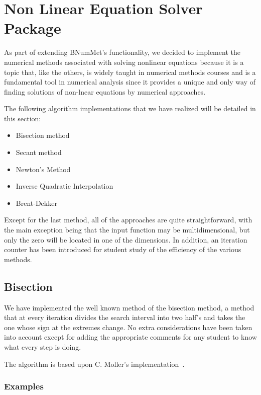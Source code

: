 \section{Non Linear Equation Solver Package}
As part of extending BNumMet's functionality, we decided to implement the numerical methods associated with solving nonlinear equations because it is a topic that, like the others, is widely taught in numerical methods courses and is a fundamental tool in numerical analysis since it provides a unique and only way of finding solutions of non-lnear equations by numerical approaches.

The following algorithm implementations that we have realized will be detailed in this section:
\begin{itemize}
    \item Bisection method 
    \item Secant  method 
    \item Newton's Method 
    \item Inverse Quadratic Interpolation 
    \item Brent-Dekker  
\end{itemize}

Except for the last method, all of the approaches are quite straightforward, with the main exception being that the input function may be multidimensional, but only the zero will be located in one of the dimensions. In addition, an iteration counter has been introduced for student study of the efficiency of the various methods.

\subsection{Bisection}
We have implemented the well known method of the bisection method, a method that at every iteration divides the search interval into two half's and takes the one whose sign at the extremes change. No extra considerations have been taken into account except for adding the appropriate comments for any student to know what every step is doing.

The algorithm is based upon C. Moller's implementation~\cite{doi:10.1137/1.9780898717952}.
\subsubsection{Examples}
	


